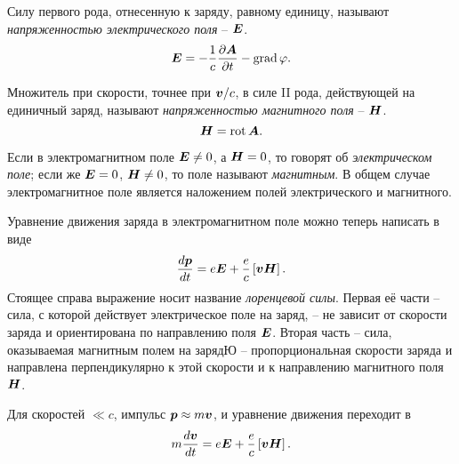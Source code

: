 \begin{to_def} 
    Силу первого рода, отнесенную к заряду, равному единицу, называют \textit{напряженностью электрического поля} -- $\mbox{\boldmath $E$}$.
    \begin{equation}
    \label{17_3}
        \mbox{\boldmath $E$} = - \frac{1}{c} \frac{\partial \mbox{\boldmath $A$}}{\partial t} - \mathop{\mathrm{grad}}\nolimits \varphi.
    \end{equation}
\end{to_def}

\begin{to_def} 
    Множитель при скорости, точнее при $\mbox{\boldmath $v$}/c$, в силе II рода, действующей на единичный заряд, называют \textit{напряженностью магнитного поля} -- $\mbox{\boldmath $H$}$.
    \begin{equation}
    \label{17_4}
         \mbox{\boldmath $H$} = \mathop{\mathrm{rot}}\nolimits \mbox{\boldmath $A$}.
    \end{equation} 
\end{to_def}

\begin{to_def} 
    Если в электромагнитном поле $\mbox{\boldmath $E$} \neq 0$, а $\mbox{\boldmath $H$} = 0$, то говорят об \textit{электрическом поле}; если же $\mbox{\boldmath $E$} = 0$, $\mbox{\boldmath $H$} \neq 0$, то поле называют \textit{магнитным}. В общем случае электромагнитное поле является наложением полей электрического и магнитного. 
\end{to_def}

 Уравнение движения заряда в электромагнитном поле можно теперь написать в виде
\begin{equation}
\label{17_5}
    \frac{d \mbox{\boldmath $p$}}{dt} = e \mbox{\boldmath $E$} + \frac{e}{c} \left[\mbox{\boldmath $v$} \mbox{\boldmath $H$}\right].
\end{equation}
Стоящее справа выражение носит название \textit{лоренцевой силы}. Первая её части -- сила, с которой действует электрическое поле на заряд, -- не зависит от скорости заряда и ориентирована по направлению поля $\mbox{\boldmath $E$}$. Вторая часть -- сила, оказываемая магнитным полем на зарядЮ -- пропорциональная скорости заряда и направлена перпендикулярно к этой скорости и к направлению магнитного поля $\mbox{\boldmath $H$}$.

Для скоростей $\ll c$, импульс $\mbox{\boldmath $p$} \approx m \mbox{\boldmath $v$}$, и уравнение движения переходит в 
\begin{equation}
    m \frac{d \mbox{\boldmath $v$}}{dt} = e \mbox{\boldmath $E$} + \frac{e}{c} \left[\mbox{\boldmath $v$} \mbox{\boldmath $H$}\right].
\end{equation}

